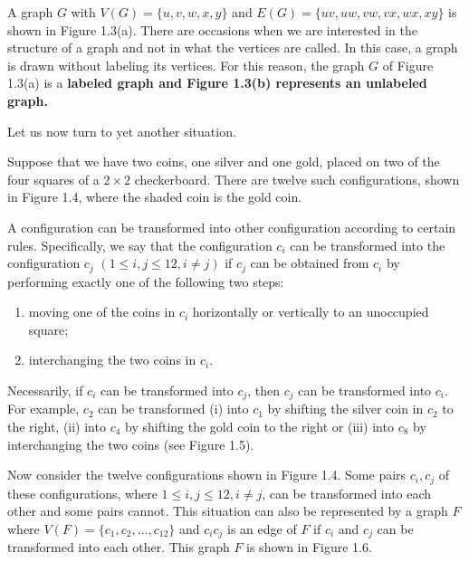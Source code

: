 A graph $G$ with $V(G) = \{u,v,w,x,y\}$ and $E(G) = \{uv,uw,vw,vx,wx,xy\}$ is shown in Figure 1.3(a). There are occasions when we are interested in the structure of a graph and not in what the vertices are called. In this case, a graph is drawn without labeling its vertices. For this reason, the graph $G$ of Figure 1.3(a) is a \bf{labeled graph} and Figure 1.3(b) represents an \bf{unlabeled graph}.



Let us now turn to yet another situation.

\begin{exmp}
Suppose that we have two coins, one silver and one gold, placed on two of the four squares of a $2 \times 2$ checkerboard. There are twelve such configurations, shown in Figure 1.4, where the shaded coin is the gold coin.



A configuration can be transformed into other configuration according to certain rules. Specifically, we say that the configuration $c_{i}$ can be transformed into the configuration $c_{j}$ $(1 \leq i, j \leq 12, i \neq j)$ if $c_{j}$ can be obtained from $c_{i}$ by performing exactly one of the following two steps:
\begin{enumerate}[{(1)}]
\item moving one of the coins in $c_{i}$ horizontally or vertically to an unoccupied square;
\item interchanging the two coins in $c_{i}$.
\end{enumerate}
Necessarily, if $c_{i}$ can be transformed into $c_{j}$, then $c_{j}$ can be transformed into $c_{i}$. For example, $c_{2}$ can be transformed (i) into $c_{1}$ by shifting the silver coin in $c_{2}$ to the right, (ii) into $c_{4}$ by shifting the gold coin to the right or (iii) into $c_{8}$ by interchanging the two coins (see Figure 1.5).



Now consider the twelve configurations shown in Figure 1.4. Some pairs $c_{i}, c_{j}$ of these configurations, where $1 \leq i, j \leq 12, i \neq j$, can be transformed into each other and some pairs cannot. This situation can also be represented by a graph $F$ where $V(F) = \{c_{1},c_{2},\ldots,c_{12}\}$ and $c_{i}c_{j}$ is an edge of $F$ if $c_{i}$ and $c_{j}$ can be transformed into each other. This graph $F$ is shown in Figure 1.6.
\end{exmp}

